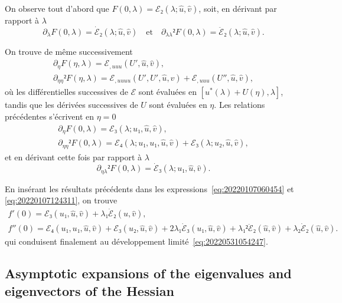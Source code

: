 \documentclass[12pt, final]{scrartcl}
\theoremstyle{definition}
\begin{document}
On observe tout d'abord que \(F(0, λ) =ℰ₂(λ; \hat{u}, \hat{v})\), soit, en
dérivant par rapport à \(λ\)
\begin{equation*}
  ∂_{λ} F(0, λ) = \dot{ℰ}₂(λ; \hat{u}, \hat{v})
  \quad \text{et} \quad
  ∂_{λλ}² F(0, λ) = \ddot{ℰ}₂(λ; \hat{u}, \hat{v}).
\end{equation*}

On trouve de même successivement
\begin{gather*}
  ∂_{η} F(η, λ) = ℰ_{, uuu}(U', \hat{u}, \hat{v}),\\
  ∂_{ηη}² F(η, λ) = ℰ_{, uuuu}(U', U', \hat{u}, \hat{v}) + ℰ_{, uuu}(U'', \hat{u}, \hat{v}),
\end{gather*}
où les différentielles successives de \(ℰ\) sont évaluées en
\([u^{\ast}(λ) + U(η), λ]\), tandis que les dérivées successives de \(U\) sont
évaluées en \(η\). Les relations précédentes s'écrivent en \(η = 0\)
\begin{gather*}
  ∂_{η} F(0, λ) = ℰ₃(λ; u₁, \hat{u}, \hat{v}),\\
  ∂_{ηη}² F(0, λ) = ℰ₄(λ ; u₁, u₁, \hat{u}, \hat{v}) + ℰ₃(λ; u₂, \hat{u}, \hat{v}),
\end{gather*}
et en dérivant cette fois par rapport à \(λ\)
\begin{equation*}
  ∂_{η λ}² F(0, λ) = \dot{ℰ}₃(λ; u₁, \hat{u}, \hat{v}).
\end{equation*}

En insérant les résultats précédents dans les
expressions~\eqref{eq:20220107060454} et \eqref{eq:20220107124311}, on trouve
\begin{gather*}
  f'(0) = ℰ₃(u₁, \hat{u}, \hat{v}) + λ₁ \dot{ℰ}₂(\hat{u}, \hat{v}),\\
  f''(0) = ℰ₄(u₁, u₁, \hat{u}, \hat{v}) + ℰ₃(u₂, \hat{u}, \hat{v}) + 2λ₁ \dot{ℰ}₃(u₁, \hat{u}, \hat{v}) + λ₁² \ddot{ℰ}₂(\hat{u}, \hat{v}) + λ₂ \dot{ℰ}₂(\hat{u}, \hat{v}) .
\end{gather*}
qui conduisent finalement au développement limité~\eqref{eq:20220531054247}.

\subsection{Asymptotic expansions of the eigenvalues and eigenvectors of the Hessian}
\label{sec:20220616074108}
\end{document}
